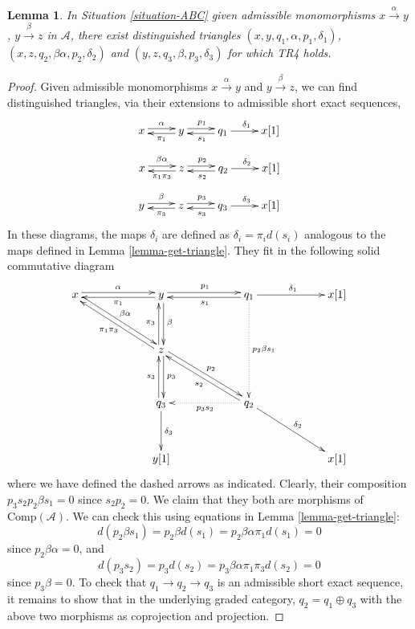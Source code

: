 \documentclass{stacks-project}
\theoremstyle{plain}
\newtheorem{lemma}[subsection]{Lemma}
\theoremstyle{definition}
\theoremstyle{remark}
\numberwithin{equation}{subsection}
\begin{document}
\begin{lemma}
\label{lemma-dgc-analogue-tr4}
In Situation \ref{situation-ABC} given admissible monomorphisms
$x \xrightarrow{\alpha} y$, $y \xrightarrow{\beta} z$ in $\mathcal{A}$,
there exist distinguished triangles
$(x,y,q_1,\alpha,p_1,\delta_1)$, $(x,z,q_2,\beta\alpha,p_2,\delta_2)$
and $(y,z,q_3,\beta,p_3,\delta_3)$ for which TR4 holds.
\end{lemma}

\begin{proof}
Given admissible monomorphisms $x\xrightarrow{\alpha} y$ and
$y\xrightarrow{\beta}z$, we can find distinguished triangles,
via their extensions to admissible short exact sequences,
$$
\xymatrix{
x\ar@<0.5ex>[r]^{\alpha} &
y\ar@<0.5ex>[l]^{\pi_1} \ar@<0.5ex>[r]^{p_1} &
q_1 \ar[r]^{\delta_1} \ar@<0.5ex>[l]^{s_1} &
x[1]
}
$$
$$
\xymatrix{
x\ar@<0.5ex>[r]^{\beta\alpha} &
z\ar@<0.5ex>[l]^{\pi_1\pi_3} \ar@<0.5ex>[r]^{p_2} &
q_2 \ar[r]^{\delta_2} \ar@<0.5ex>[l]^{s_2} &
x[1]
}
$$
$$
\xymatrix{
y\ar@<0.5ex>[r]^{\beta} &
z\ar@<0.5ex>[l]^{\pi_3} \ar@<0.5ex>[r]^{p_3} &
q_3 \ar[r]^{\delta_3} \ar@<0.5ex>[l]^{s_3} &
x[1]
}
$$
In these diagrams, the maps $\delta_i$ are defined as
$\delta_i = \pi_i d(s_i)$ analogous to the maps defined in
Lemma \ref{lemma-get-triangle}.
They fit in the following solid commutative diagram
$$
\xymatrix@C=5pc@R=3pc{
x\ar@<0.5ex>[r]^{\alpha} \ar@<0.5ex>[dr]^{\beta\alpha} &
y\ar@<0.5ex>[d]^{\beta} \ar@<0.5ex>[l]^{\pi_1} \ar@<0.5ex>[r]^{p_1} &
q_1 \ar[r]^{\delta_1} \ar@<0.5ex>[l]^{s_1} \ar@{.>}[dd]^{p_2\beta s_1} &
x[1] \\
 &
z \ar@<0.5ex>[u]^{\pi_3}\ar@<0.5ex>[d]^{p_3}
\ar@<0.5ex>[dr]^{p_2} \ar@<0.5ex>[ul]^{\pi_1\pi_3} & & \\
 &
q_3\ar@<0.5ex>[u]^{s_3} \ar[d]^{\delta_3} &
q_2 \ar@{.>}[l]^{p_3s_2} \ar@<0.5ex>[ul]^{s_2} \ar[dr]^{\delta_2} \\
 &
y[1] & & x[1]}
$$
where we have defined the dashed arrows as indicated.
Clearly, their composition $p_3s_2p_2\beta s_1 = 0$
since $s_2p_2 = 0$. We claim that they both are morphisms of
$\text{Comp}(\mathcal{A})$. We can check this using equations in
Lemma \ref{lemma-get-triangle}:
$$
d(p_2\beta s_1) = p_2\beta d(s_1) = p_2\beta\alpha\pi_1 d(s_1) = 0
$$
since $p_2\beta\alpha = 0$, and
$$
d(p_3s_2) = p_3d(s_2) = p_3\beta\alpha\pi_1\pi_3 d(s_2) = 0
$$
since $p_3\beta = 0$. To check that $q_1\to q_2\to q_3$
is an admissible short exact sequence, it remains to show
that in the underlying graded category, $q_2 = q_1\oplus q_3$
with the above two morphisms as coprojection and projection.

\end{proof}
\end{document}
